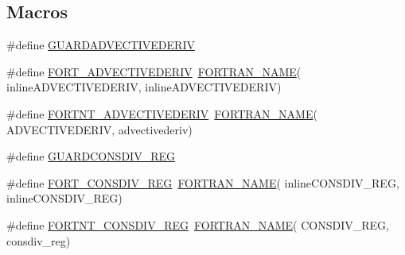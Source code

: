 \subsection*{Macros}
\begin{DoxyCompactItemize}
\item 
\#define \hyperlink{cdr__solverF__F_8H_a72bc5875925d943667e94848ede8f831}{G\+U\+A\+R\+D\+A\+D\+V\+E\+C\+T\+I\+V\+E\+D\+E\+R\+IV}
\item 
\#define \hyperlink{cdr__solverF__F_8H_a5aaba729adb83ac2d0d21d3a38b9a1fe}{F\+O\+R\+T\+\_\+\+A\+D\+V\+E\+C\+T\+I\+V\+E\+D\+E\+R\+IV}~\hyperlink{cdr__solverF__F_8H_afe590fe98bbd9490452f10e795b91052}{F\+O\+R\+T\+R\+A\+N\+\_\+\+N\+A\+ME}( inline\+A\+D\+V\+E\+C\+T\+I\+V\+E\+D\+E\+R\+IV, inline\+A\+D\+V\+E\+C\+T\+I\+V\+E\+D\+E\+R\+IV)
\item 
\#define \hyperlink{cdr__solverF__F_8H_af58a7c8eedeca35fdb56c2e8f2f511cb}{F\+O\+R\+T\+N\+T\+\_\+\+A\+D\+V\+E\+C\+T\+I\+V\+E\+D\+E\+R\+IV}~\hyperlink{cdr__solverF__F_8H_afe590fe98bbd9490452f10e795b91052}{F\+O\+R\+T\+R\+A\+N\+\_\+\+N\+A\+ME}( A\+D\+V\+E\+C\+T\+I\+V\+E\+D\+E\+R\+IV, advectivederiv)
\item 
\#define \hyperlink{cdr__solverF__F_8H_a79d2445b7fdc35eff8c318746b0c5856}{G\+U\+A\+R\+D\+C\+O\+N\+S\+D\+I\+V\+\_\+\+R\+EG}
\item 
\#define \hyperlink{cdr__solverF__F_8H_a385e17564bbca6ee2883c37efd03b931}{F\+O\+R\+T\+\_\+\+C\+O\+N\+S\+D\+I\+V\+\_\+\+R\+EG}~\hyperlink{cdr__solverF__F_8H_afe590fe98bbd9490452f10e795b91052}{F\+O\+R\+T\+R\+A\+N\+\_\+\+N\+A\+ME}( inline\+C\+O\+N\+S\+D\+I\+V\+\_\+\+R\+EG, inline\+C\+O\+N\+S\+D\+I\+V\+\_\+\+R\+EG)
\item 
\#define \hyperlink{cdr__solverF__F_8H_ab9556f6f1bf8a5e86b67771d4508f597}{F\+O\+R\+T\+N\+T\+\_\+\+C\+O\+N\+S\+D\+I\+V\+\_\+\+R\+EG}~\hyperlink{cdr__solverF__F_8H_afe590fe98bbd9490452f10e795b91052}{F\+O\+R\+T\+R\+A\+N\+\_\+\+N\+A\+ME}( C\+O\+N\+S\+D\+I\+V\+\_\+\+R\+EG, consdiv\+\_\+reg)
\end{DoxyCompactItemize}
